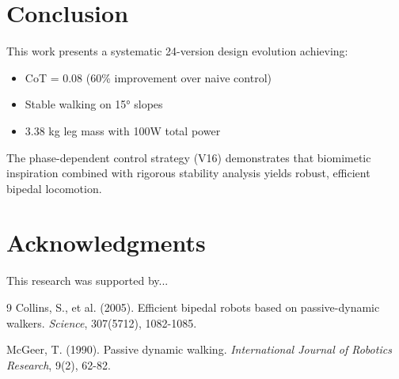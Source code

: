 \documentclass[twocolumn]{article}
\begin{document}
\section{Conclusion}

This work presents a systematic 24-version design evolution achieving:
\begin{itemize}
    \item CoT = 0.08 (60\% improvement over naive control)
    \item Stable walking on 15° slopes
    \item 3.38 kg leg mass with 100W total power
\end{itemize}

The phase-dependent control strategy (V16) demonstrates that biomimetic inspiration combined with rigorous stability analysis yields robust, efficient bipedal locomotion.

\section*{Acknowledgments}

This research was supported by...

\begin{thebibliography}{9}
 Collins, S., et al. (2005). Efficient bipedal robots based on passive-dynamic walkers. \textit{Science}, 307(5712), 1082-1085.

 McGeer, T. (1990). Passive dynamic walking. \textit{International Journal of Robotics Research}, 9(2), 62-82.
\end{thebibliography}
\end{document}
